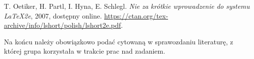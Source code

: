 \documentclass{classrep}
\begin{document}
\begin{thebibliography}{0}
   T. Oetiker, H. Partl, I. Hyna, E. Schlegl.
    \textsl{Nie za krótkie wprowadzenie do systemu \LaTeX2e}, 2007, dostępny
    online. \url{https://ctan.org/tex-archive/info/lshort/polish/lshort2e.pdf}.
\end{thebibliography}

{\color{blue}
Na końcu należy obowiązkowo podać cytowaną w sprawozdaniu literaturę, z której
grupa korzystała w trakcie prac nad zadaniem.}
\end{document}
